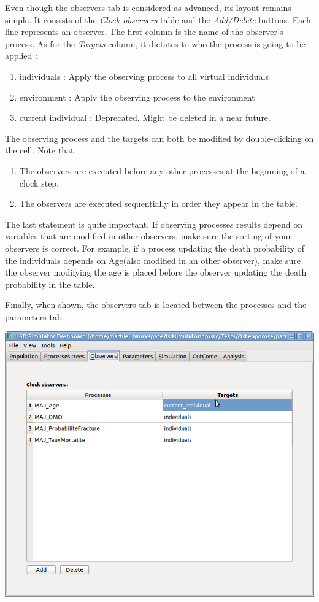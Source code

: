 \documentclass[a4paper,11pt]{report}
\begin{document}
Even though the observers tab is considered as advanced, its layout remains simple. It consists of the \emph{Clock observers} table and the \emph{Add/Delete} buttons. Each line represents an observer. The first column is the name of the observer's process. As for the \emph{Targets} column, it dictates to who the process is going to be applied :
\begin{enumerate}
\item{individuals : }Apply the observing process to all virtual individuals
\item{environment : }Apply the observing process to the environment
\item{current individual : }Deprecated. Might be deleted in a near future. 
\end{enumerate}
The observing process and the targets can both be modified by double-clicking on the cell. Note that:
\begin{enumerate}
\item{The observers are executed before any other processes at the beginning of a clock step.}
\item{The observers are executed sequentially in order they appear in the table.}
\end{enumerate}
The last statement is quite important. If observing processes results depend on variables that are modified in other observers, make sure the sorting of your observers is correct. For example, if a process updating the death probability of the individuals depends on Age(also modified in an other observer), make sure the observer modifying the age is placed before the observer updating the death probability in the table.

Finally, when shown, the observers tab is located between the processes and the parameters tab.

\begin{center}
\includegraphics[scale=0.3]{Pictures/Observers/ObserversTab.png}
\label{fig:obsTab}
\end{center}
\end{document}
